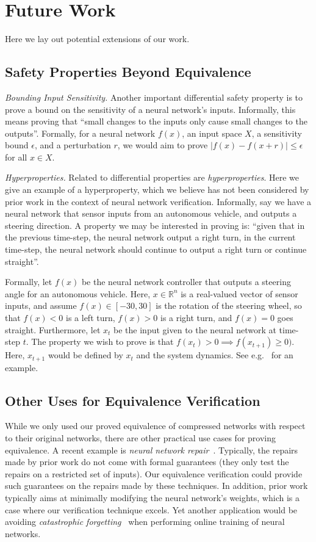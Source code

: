 \section{Future Work}
Here we lay out potential extensions of our work.

\subsection{Safety Properties Beyond Equivalence}
\textit{Bounding Input Sensitivity.} Another important differential safety
property is to prove a bound on the sensitivity of a neural network's
inputs. Informally, this means proving that ``small changes to the inputs
only cause small changes to the outputs''. Formally, for a neural network $
f(x) $, an input space $ X $, a sensitivity bound $ \epsilon $, and a
perturbation $ r $, we would aim to prove $ |f(x) - f(x + r)| \leq \epsilon
$ for all $ x \in X $.

\textit{Hyperproperties.} Related to differential properties are
\textit{hyperproperties}. Here we give an example of a hyperproperty, which
we believe has not been considered by prior work in the context of neural
network verification. Informally, say we have a neural network that sensor
inputs from an autonomous vehicle, and outputs a steering direction. A
property we may be interested in proving is: ``given that in the previous
time-step, the neural network output a right turn, in the current
time-step, the neural network should continue to output a right turn or
continue straight''.


Formally, let $ f(x) $ be the neural network controller that outputs a
steering angle for an autonomous vehicle. Here, $ x \in \mathbb{R}^n $ is a
real-valued vector of sensor inputs, and assume $ f(x) \in [-30, 30] $ is
the rotation of the steering wheel, so that $ f(x) < 0 $ is a left turn, $
f(x) > 0 $ is a right turn, and $ f(x) = 0 $ goes straight. Furthermore,
let $ x_t $ be the input given to the neural network at time-step $ t $.
The property we wish to prove is that $ f(x_t) > 0 \implies f(x_{t+1}) \geq
0) $. Here, $ x_{t+1} $ would be defined by $ x_t $ and the system
dynamics. See e.g.~\cite{hu2020reach} for an example.

\subsection{Other Uses for Equivalence Verification}
While we only used our proved equivalence of compressed networks with
respect to their original networks, there are other practical use cases for
proving equivalence. A recent example is \textit{neural network
repair}~\cite{yang2021neural,usman2021nn,sotoudeh2021provable,dong2021towards}.
 Typically,
the repairs made by prior work do not come with formal guarantees (they
only test the repairs on a restricted set of inputs). Our equivalence
verification could provide such guarantees on the repairs made by these
techniques. In addition, prior work typically aims at minimally modifying
the neural network's weights, which is a case where our verification
technique excels. Yet another application would be avoiding
\textit{catastrophic forgetting}~\cite{kirkpatrick2017overcoming} when
performing online training of neural networks.

